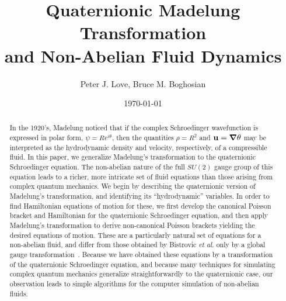 \documentclass[a4paper,aps,prd,preprint,groupedaddress]{revtex4}
\newcommand{\bfu}{{\bf u}}
\newcommand{\bfnabla}{{\mbox{\boldmath $\nabla$}}}
\begin{document}

\title{Quaternionic Madelung Transformation\\ and Non-Abelian Fluid Dynamics}


\author{Peter J. Love, Bruce M. Boghosian}

\date{\today}

\begin{abstract}
In the 1920's, Madelung noticed that if the complex Schroedinger wavefunction is expressed in polar form, $\psi = R e^{i\theta}$, then the quantities $\rho=R^2$ and $\bfu = \bfnabla\theta$ may be interpreted as the hydrodynamic density and velocity, respectively,  of a compressible fluid.  In this paper, we generalize Madelung's transformation to the quaternionic Schroedinger equation. The non-abelian nature of the full $SU(2)$ gauge group of this equation leads to a richer, more intricate set of fluid equations than those arising from complex quantum mechanics. We begin by describing the quaternionic version of Madelung's transformation, and identifying its ``hydrodynamic'' variables. In order to find Hamiltonian equations of motion for these, we first develop the canonical Poisson bracket and Hamiltonian for the quaternionic Schroedinger equation, and then apply Madelung's transformation to derive non-canonical Poisson brackets yielding the desired equations of motion. These are a particularly natural set of equations for a non-abelian fluid, and differ from those obtained by Bistrovic {\it et al.} only by a global gauge transformation~\cite{bib:jackiw2}. Because we have obtained these equations by a transformation of the quaternionic Schroedinger equation, and because many techniques for simulating complex quantum mechanics generalize straightforwardly to the quaternionic case,  our observation leads to simple algorithms for the computer simulation of non-abelian fluids.
\end{abstract}
\end{document}
